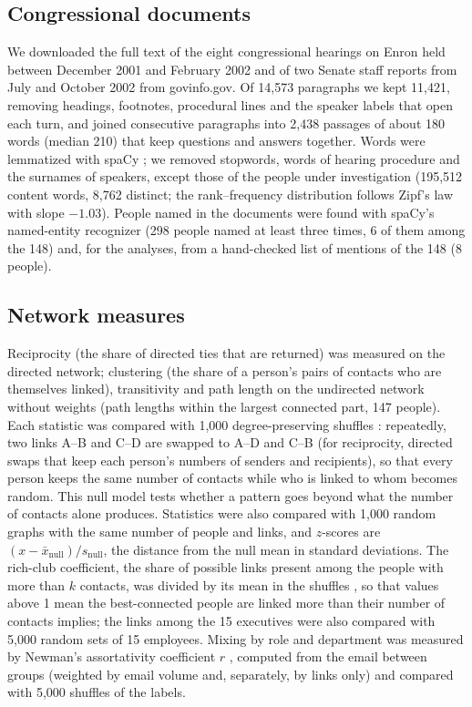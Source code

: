 \documentclass[9pt,twocolumn,twoside]{pnas-new}
\begin{document}
\subsection*{Congressional documents}
We downloaded the full text of the eight congressional hearings on Enron held between
December 2001 and February 2002 and of two Senate staff reports from July and October 2002
\cite{senate2002board,senate2002oversight,congress2002hearings} from govinfo.gov. Of 14,573
paragraphs we kept 11,421, removing headings, footnotes, procedural lines and the speaker
labels that open each turn, and joined consecutive paragraphs into 2,438 passages of about
180 words (median 210) that keep questions and answers together. Words were lemmatized with
spaCy \cite{spacy}; we removed stopwords, words of hearing procedure and the surnames of
speakers, except those of the people under investigation (195,512 content words, 8,762
distinct; the rank--frequency distribution follows Zipf's law with slope $-1.03$). People
named in the documents were found with spaCy's named-entity recognizer (298 people named at
least three times, 6 of them among the 148) and, for the analyses, from a hand-checked list
of mentions of the 148 (8 people).

\subsection*{Network measures}
Reciprocity (the share of directed ties that are returned) was measured on the directed
network; clustering (the share of a person's pairs of contacts who are themselves linked),
transitivity and path length on the undirected network without weights (path lengths within
the largest connected part, 147 people). Each statistic was compared with 1,000
degree-preserving shuffles \cite{maslov2002}: repeatedly, two links A--B and C--D are swapped
to A--D and C--B (for reciprocity, directed swaps that keep each person's numbers of senders
and recipients), so that every person keeps the same number of contacts while who is linked
to whom becomes random. This null model tests whether a pattern goes beyond what the number
of contacts alone produces. Statistics were also compared with 1,000 random graphs with the
same number of people and links, and $z$-scores are $(x - \bar{x}_{\mathrm{null}}) /
s_{\mathrm{null}}$, the distance from the null mean in standard deviations. The rich-club
coefficient, the share of possible links present among the people with more than $k$
contacts, was divided by its mean in the shuffles \cite{colizza2006}, so that values above 1
mean the best-connected people are linked more than their number of contacts implies; the
links among the 15 executives were also compared with 5,000 random sets of 15 employees.
Mixing by role and department was measured by Newman's assortativity coefficient $r$
\cite{newman2003}, computed from the email between groups (weighted by email volume and,
separately, by links only) and compared with 5,000 shuffles of the labels.
\end{document}
